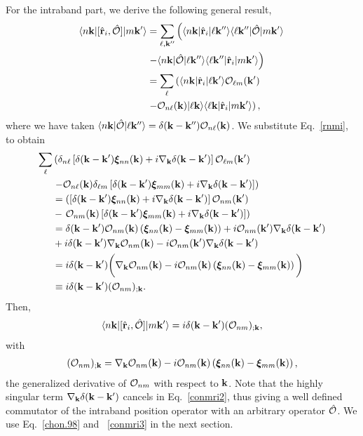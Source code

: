 For the intraband part, we derive the following general result,
\begin{align}\label{conmri}
\langle n\mathbf{k} |[\hat{\mathbf{r}}_i,\hat{{\cal O}}]| m\mathbf{k}' \rangle
&=
\sum_{\ell,\mathbf{k}''}
\left(
\langle n\mathbf{k} |
\hat{\mathbf{r}}_i
| \ell\mathbf{k}'' \rangle
\langle \ell\mathbf{k}'' |
\hat{{\cal O}}
| m\mathbf{k}' \rangle
\right.
\nonumber \\
&
\left.
-
\langle n\mathbf{k} |
\hat{{\cal O}}
| \ell\mathbf{k}'' \rangle
\langle \ell\mathbf{k}'' |
\hat{\mathbf{r}}_i
| m\mathbf{k}' \rangle
\right)
\nonumber \\
&=
\sum_{\ell}
\left(
\langle n\mathbf{k} |
\hat{\mathbf{r}}_i
| \ell\mathbf{k}' \rangle
{\cal O}_{\ell m}(\mathbf{k}')
\right.
\nonumber \\
&
\left.
-
{\cal O}_{n\ell}(\mathbf{k})
| \ell\mathbf{k} \rangle
\langle \ell\mathbf{k} |
\hat{\mathbf{r}}_i
| m\mathbf{k}' \rangle
\right)
,
\end{align}
where we have taken
$\langle n\mathbf{k} |\hat{{\cal O}}| \ell\mathbf{k}'' \rangle=\delta(\mathbf{k}-\mathbf{k}''){\cal O}_{n\ell}(\mathbf{k})$.
We substitute Eq.~\eqref{rnmi}, to obtain
\begin{align}\label{conmri2}
\sum_{\ell}&
\left(
\delta_{n\ell}\left[\delta(\mathbf{k}-\mathbf{k}')\boldsymbol{\xi}_{nn}(\mathbf{k})
+i\nabla_{\mathbf{k}}\delta(\mathbf{k}-\mathbf{k}')\right]
{\cal O}_{\ell m}(\mathbf{k}')
\right.
\nonumber \\
&
\left.
-
{\cal O}_{n\ell}(\mathbf{k})
\delta_{\ell m}\left[\delta(\mathbf{k}-\mathbf{k}')\boldsymbol{\xi}_{mm}(\mathbf{k})
+i\nabla_{\mathbf{k}}\delta(\mathbf{k}-\mathbf{k}')\right]
\right)
\nonumber\\
&=
\left(
\left[\delta(\mathbf{k}-\mathbf{k}')\boldsymbol{\xi}_{nn}(\mathbf{k})
+i\nabla_{\mathbf{k}}\delta(\mathbf{k}-\mathbf{k}')\right]
{\cal O}_{n m}(\mathbf{k}')
\right.
\nonumber \\
&-
\left.
{\cal O}_{nm}(\mathbf{k})
\left[\delta(\mathbf{k}-\mathbf{k}')\boldsymbol{\xi}_{mm}(\mathbf{k})
+i\nabla_{\mathbf{k}}\delta(\mathbf{k}-\mathbf{k}')\right]
\right)
\nonumber\\
&=
\delta(\mathbf{k}-\mathbf{k}')
{\cal O}_{nm}(\mathbf{k})
\left(
\boldsymbol{\xi}_{nn}(\mathbf{k})
-
\boldsymbol{\xi}_{mm}(\mathbf{k})
\right)
+i{\cal O}_{n m}(\mathbf{k}')
\nabla_{\mathbf{k}}
\delta(\mathbf{k}-\mathbf{k}')
\nonumber \\
&+i
\delta(\mathbf{k}-\mathbf{k}')
\nabla_{\mathbf{k}}
{\cal O}_{n m}(\mathbf{k})
-
i{\cal O}_{n m}(\mathbf{k}')
\nabla_{\mathbf{k}}\delta(\mathbf{k}-\mathbf{k}')
\nonumber \\
&=
i\delta(\mathbf{k}-\mathbf{k}')
\bigg(
\nabla_{\mathbf{k}}
{\cal O}_{n m}(\mathbf{k})
-
i
{\cal O}_{nm}(\mathbf{k})
\left(
\boldsymbol{\xi}_{nn}(\mathbf{k})
-
\boldsymbol{\xi}_{mm}(\mathbf{k})
\right)
\bigg)
\nonumber \\
&\equiv
i\delta(\mathbf{k}-\mathbf{k}')({\cal O}_{nm})_{;\mathbf{k}}
.
\end{align}
Then,
\begin{align}\label{conmri3}
\langle n\mathbf{k} |[\hat{\mathbf{r}}_i,\hat{{\cal O}}]| m\mathbf{k}' \rangle
=i\delta(\mathbf{k}-\mathbf{k}')({\cal O}_{nm})_{;\mathbf{k}}
,
\end{align}   
with
\begin{align}\label{gendev}
({\cal O}_{nm})_{;\mathbf{k}}=
\nabla_{\mathbf{k}}
{\cal O}_{n m}(\mathbf{k})
-  
i
{\cal O}_{nm}(\mathbf{k})
\left(
\boldsymbol{\xi}_{nn}(\mathbf{k})
-
\boldsymbol{\xi}_{mm}(\mathbf{k})
\right)
,
\end{align}  
the generalized derivative of ${\cal O}_{nm}$ with respect to $\mathbf{k}$.
Note that the highly singular term $\nabla_{\mathbf{k}}\delta(\mathbf{k}-\mathbf{k}')$
cancels in Eq.~\eqref{conmri2}, thus giving a well defined commutator
of the intraband position operator with an arbitrary operator $\hat{{\cal O}}$.
We use Eq.~\eqref{chon.98} and ~\eqref{conmri3}  in the next section.
